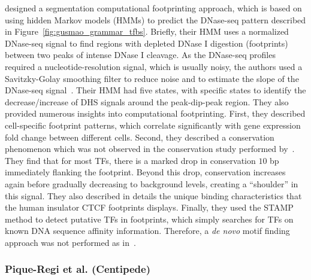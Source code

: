 \cite{boyle2011} designed a segmentation computational footprinting approach, which is based on using hidden Markov models (HMMs) to predict the DNase-seq pattern described in Figure~\ref{fig:gusmao_grammar_tfbs}. Briefly, their HMM uses a normalized DNase-seq signal to find regions with depleted DNase I digestion (footprints) between two peaks of intense DNase I cleavage. As the DNase-seq profiles required a nucleotide-resolution signal, which is usually noisy, the authors used a Savitzky-Golay smoothing filter to reduce noise and to estimate the slope of the DNase-seq signal~\citep{madden1978}. Their HMM had five states, with specific states to identify the decrease/increase of DHS signals around the peak-dip-peak region. They also provided numerous insights into computational footprinting. First, they described cell-specific footprint patterns, which correlate significantly with gene expression fold change between different cells. Second, they described a conservation phenomenon which was not observed in the conservation study performed by~\cite{hesselberth2009}. They find that for most TFs, there is a marked drop in conservation \approxy$10$ bp immediately flanking the footprint. Beyond this drop, conservation increases again before gradually decreasing to background levels, creating a ``shoulder'' in this signal. They also described in details the unique binding characteristics that the human insulator CTCF footprints displays. Finally, they used the STAMP~\citep{mahony2007} method to detect putative TFs in footprints, which simply searches for TFs on known DNA sequence affinity information. Therefore, a \emph{de novo} motif finding approach was not performed as in~\cite{neph2012a}.

\subsubsection{Pique-Regi et al. (Centipede)}


